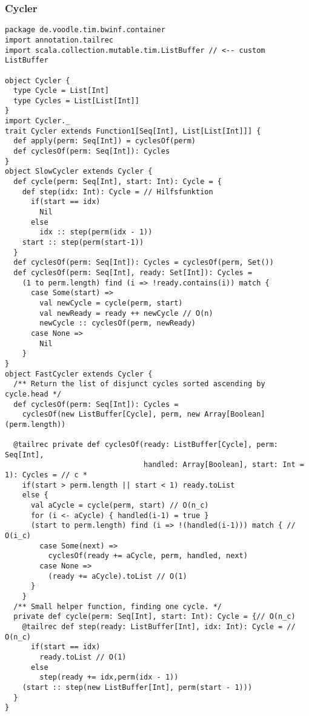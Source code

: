 \subsubsection{Cycler}
\lstset{basicstyle=\ttfamily\scriptsize}
\begin{lstlisting}
package de.voodle.tim.bwinf.container
import annotation.tailrec
import scala.collection.mutable.tim.ListBuffer // <-- custom ListBuffer

object Cycler {
  type Cycle = List[Int]
  type Cycles = List[List[Int]]
}
import Cycler._
trait Cycler extends Function1[Seq[Int], List[List[Int]]] {
  def apply(perm: Seq[Int]) = cyclesOf(perm)
  def cyclesOf(perm: Seq[Int]): Cycles
}
object SlowCycler extends Cycler {
  def cycle(perm: Seq[Int], start: Int): Cycle = {
    def step(idx: Int): Cycle = // Hilfsfunktion
      if(start == idx)
        Nil
      else
        idx :: step(perm(idx - 1))
    start :: step(perm(start-1))
  }
  def cyclesOf(perm: Seq[Int]): Cycles = cyclesOf(perm, Set())
  def cyclesOf(perm: Seq[Int], ready: Set[Int]): Cycles =
    (1 to perm.length) find (i => !ready.contains(i)) match {
      case Some(start) =>
        val newCycle = cycle(perm, start)
        val newReady = ready ++ newCycle // O(n)
        newCycle :: cyclesOf(perm, newReady)
      case None =>
        Nil
    }
}
object FastCycler extends Cycler {
  /** Return the list of disjunct cycles sorted ascending by cycle.head */
  def cyclesOf(perm: Seq[Int]): Cycles =
    cyclesOf(new ListBuffer[Cycle], perm, new Array[Boolean](perm.length))

  @tailrec private def cyclesOf(ready: ListBuffer[Cycle], perm: Seq[Int],
                                handled: Array[Boolean], start: Int = 1): Cycles = // c *
    if(start > perm.length || start < 1) ready.toList
    else {
      val aCycle = cycle(perm, start) // O(n_c)
      for (i <- aCycle) { handled(i-1) = true }
      (start to perm.length) find (i => !(handled(i-1))) match { // O(i_c)
        case Some(next) =>
          cyclesOf(ready += aCycle, perm, handled, next)
        case None =>
          (ready += aCycle).toList // O(1)
      }
    }
  /** Small helper function, finding one cycle. */
  private def cycle(perm: Seq[Int], start: Int): Cycle = {// O(n_c)
    @tailrec def step(ready: ListBuffer[Int], idx: Int): Cycle = // O(n_c)
      if(start == idx)
        ready.toList // O(1)
      else
        step(ready += idx,perm(idx - 1))
    (start :: step(new ListBuffer[Int], perm(start - 1)))
  }
}
\end{lstlisting}

